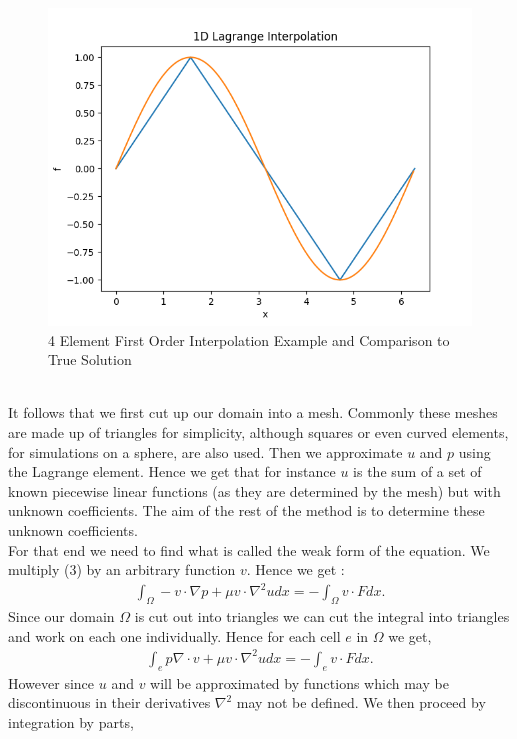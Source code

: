 \documentclass[11pt,twoside,a4paper]{article}
\begin{document}
\begin{figure}
  \includegraphics[width=\linewidth]{ex_1D_LG.png}
  \caption{4 Element First Order Interpolation Example and Comparison to True Solution}
\end{figure}
\\
It follows that we first cut up our domain into a mesh. Commonly these meshes are made up of triangles for simplicity, although squares or even curved elements, for simulations on a sphere, are also used. Then we approximate $u$ and $p$ using the Lagrange element. Hence we get that for instance $u$ is the sum of a set of known piecewise linear functions (as they are determined by the mesh) but with unknown coefficients. The aim of the rest of the method is to determine these unknown coefficients.\\
For that end we need to find what is called the weak form of the equation. We multiply (3) by an arbitrary function $v$. Hence we get :
\begin{align*}
\int_{\Omega} -v \cdot \nabla p + \mu v \cdot \nabla^2 u dx = -\int_{\Omega} v \cdot F dx .
\end{align*}
Since our domain $\Omega$ is cut out into triangles we can cut the integral into triangles and work on each one individually. Hence for each cell $e$ in $\Omega$ we get,
\begin{align*}
\int_{e} p \nabla \cdot v + \mu v \cdot \nabla^2 u dx =  -\int_{e} v \cdot F dx .
\end{align*}
However since $u$ and $v$ will be approximated by functions which may be discontinuous in their derivatives $\nabla^2$ may not be defined. We then proceed by integration by parts,
\end{document}
